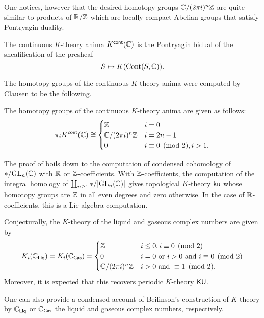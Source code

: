 One notices, however that the desired homotopy groups $\mathbb{C}/(2\pi i)^{n}\mathbb{Z}$ are quite similar to products of $\mathbb{R}/\mathbb{Z}$ which are locally compact Abelian groups that satisfy Pontryagin duality. 
\begin{definition}\label{def: continuous K-theory anima}
    The continuous $K$-theory anima $K^{\mathsf{cont}}(\mathbb{C})$ is the Pontryagin bidual of the sheafification of the presheaf 
    $$S\mapsto K(\mathrm{Cont}(S,\mathbb{C})).$$
\end{definition}
The homotopy groups of the continuous $K$-theory anima were computed by Clausen to be the following. 
\begin{theorem}[Clausen]\label{thm: Clausen condensed k theory}
    The homotopy groups of the continuous $K$-theory anima are given as follows:
    $$\pi_{i}K^{\mathsf{cont}}(\mathbb{C})\cong\begin{cases}
        \mathbb{Z} & i=0 \\
        \mathbb{C}/(2\pi i)^{n}\mathbb{Z} & i=2n-1 \\
        0 & i\equiv0\pmod{2}, i>1.
    \end{cases}$$
\end{theorem}
The proof of  boils down to the computation of condensed cohomology of $*/\mathrm{GL}_{n}(\mathbb{C})$ with $\mathbb{R}$ or $\mathbb{Z}$-coefficients. With $\mathbb{Z}$-coefficients, the computation of the integral homology of $\coprod_{n\geq 1}*/|\mathrm{GL}_{n}(\mathbb{C})|$ gives topological $K$-theory $\mathsf{ku}$ whose homotopy groups are $\mathbb{Z}$ in all even degrees and zero otherwise. In the case of $\mathbb{R}$-coefficients, this is a Lie algebra computation.
\begin{remark}
    Conjecturally, the $K$-theory of the liquid and gaseous complex numbers are given by 
    $$K_{i}(\mathbb{C}_{\mathsf{Liq}})=K_{i}(\mathbb{C}_{\mathsf{Gas}})=\begin{cases}
        \mathbb{Z} & i\leq 0, i\equiv0\pmod{2} \\
        0 & i=0 \text{ or }i>0\text{ and }i\equiv0\pmod{2} \\
        \mathbb{C}/(2\pi i)^{n}\mathbb{Z} & i>0\text{ and }\equiv1\pmod{2}.
    \end{cases}$$
    Moreover, it is expected that this recovers periodic $K$-theory $\mathsf{KU}$. 
\end{remark}

One can also provide a condensed account of Beilinson's construction of $K$-theory by $\mathbb{C}_{\mathsf{Liq}}$ or $\mathbb{C}_{\mathsf{Gas}}$ the liquid and gaseous complex numbers, respectively. 

